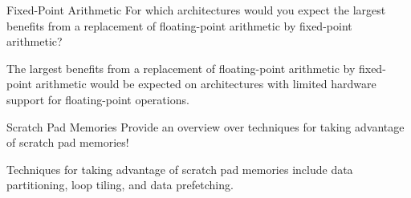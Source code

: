\documentclass{article}
\begin{document}
\begin{exercise}{Fixed-Point Arithmetic}
  For which architectures would you expect the largest benefits from a replacement of floating-point arithmetic by fixed-point arithmetic?

  \begin{solution}
    The largest benefits from a replacement of floating-point arithmetic by fixed-point arithmetic would be expected on architectures with limited hardware support for floating-point operations.
  \end{solution}
\end{exercise}

\begin{exercise}{Scratch Pad Memories}
  Provide an overview over techniques for taking advantage of scratch pad memories!

  \begin{solution}
    Techniques for taking advantage of scratch pad memories include data partitioning, loop tiling, and data prefetching.
  \end{solution}
\end{exercise}
\end{document}
